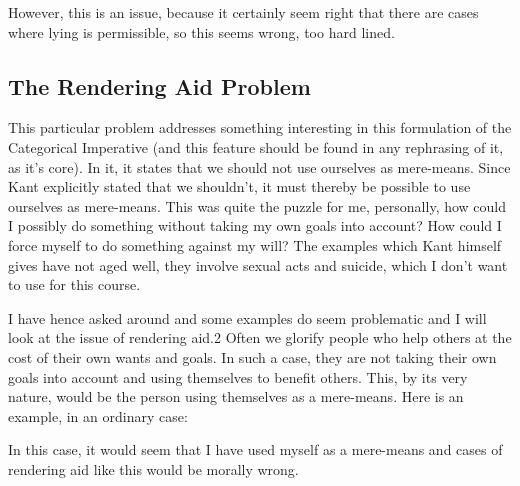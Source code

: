 However, this is an issue, because it certainly seem right that there are cases where lying is permissible, so this seems wrong, too hard lined. 
\subsection{The Rendering Aid Problem}

This particular problem addresses something interesting in this formulation of the Categorical Imperative (and this feature should be found in any rephrasing of it, as it's core). In it, it states that we should not use ourselves as mere-means. Since Kant explicitly stated that we shouldn't, it must thereby be possible to use ourselves as mere-means. This was quite the puzzle for me, personally, how could I possibly do something without taking my own goals into account? How could I force myself to do something against my will? The examples which Kant himself gives have not aged well, they involve sexual acts and suicide, which I don't want to use for this course. 

I have hence asked around and some examples do seem problematic and I will look at the issue of rendering aid.2 Often we glorify people who help others at the cost of their own wants and goals. In such a case, they are not taking their own goals into account and using themselves to benefit others. This, by its very nature, would be the person using themselves as a mere-means. Here is an example, in an ordinary case:


In this case, it would seem that I have used myself as a mere-means and cases of rendering aid like this would be morally wrong.    
